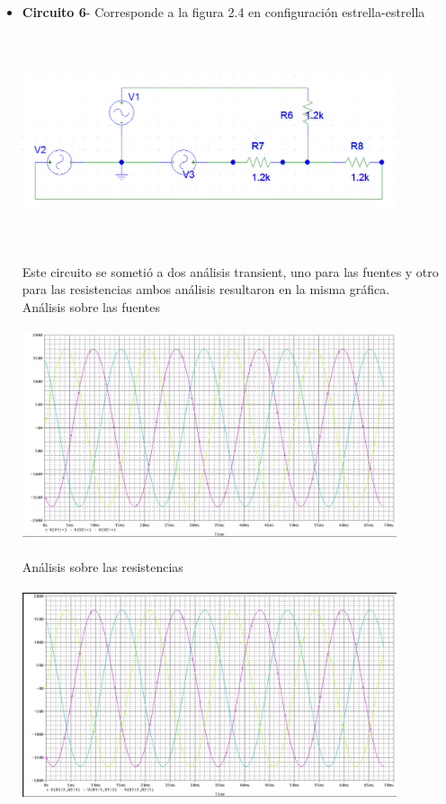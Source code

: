 \documentclass[12pt]{article}
\begin{document}
\begin{itemize}
		\item \textbf{Circuito 6}- Corresponde a la figura 2.4 en configuración estrella-estrella\\
		
		\includegraphics[width=11cm,height=7cm]{Img/trifas_str_str}\\
		
		\noindent Este circuito se sometió a dos análisis transient, uno para las fuentes y otro para las resistencias ambos análisis resultaron en la misma gráfica.\\
		
		\noindent Análisis sobre las fuentes\\
		
		\includegraphics[width=11cm,height=7cm]{Img/Circuito_trifasico_estrella_delta}\\
		
		\noindent Análisis sobre las resistencias\\
		
		\includegraphics[width=11cm,height=7cm]{Img/circ_trifas_estr_estr_resistencias}\\
		

\end{itemize}
\end{document}
